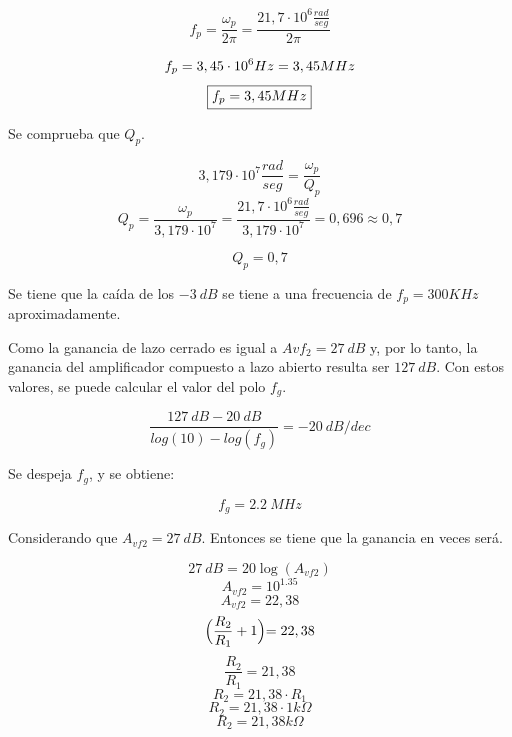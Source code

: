 \begin{equation}
    f_p = \frac{\omega_p}{2\pi}=\frac{21,7 \cdot 10^6 \frac{rad}{seg}}{2\pi}
\end{equation}

\begin{equation}
    f_p = 3,45\cdot 10^6 \space Hz= 3,45\space MHz
\end{equation}
\begin{equation}
    \boxed{
    f_p = 3,45\space MHz
    }
\end{equation}

\bigskip
\hspace{1mm} Se comprueba que \( Q_p \).

\begin{equation}
    3,179 \cdot 10^7 \frac{rad}{seg} = \frac{\omega_p}{Q_p} 
\end{equation}
\begin{equation}
    Q_p = \frac{\omega_p}{3,179 \cdot 10^7} = \frac{21,7 \cdot 10^6 \frac{rad}{seg}}{3,179 \cdot 10^7} = 0,696 \approx 0,7
\end{equation}

\begin{equation}
    \boxed{
    Q_p = 0,7
    }
\end{equation}

\hspace{1mm} Se tiene que la caída de los \(-3~dB\) se tiene a una frecuencia de \(f_p=300KHz\) aproximadamente.

\hspace{1mm} Como la ganancia de lazo cerrado es igual a \(Avf_2=27~dB\) y, por lo tanto, la ganancia del amplificador compuesto a lazo abierto resulta ser \(127~dB\). Con estos valores, se puede calcular el valor del polo \(f_g\).

\begin{equation}
    \frac{127~dB-20~dB}{log(10)-log(f_g)}=-20~dB/dec
\end{equation}

\bigskip
\hspace{1mm} Se despeja \(f_g\), y se obtiene:

\begin{equation}
\boxed{
    f_g=2.2~MHz
}
\end{equation}

\hspace{1mm} Considerando que \(A_{vf2}=27~dB\). Entonces se tiene que la ganancia en veces será.

\[27~dB= 20 \log(A_{vf2})\]
\[A_{vf2}=10^{1.35}\]
\[A_{vf2}=22,38\]
\[\Bigl( {\frac{R_2}{R_1}+1} \Bigl)=22,38\]
\[\frac{R_2}{R_1}=21,38\]
\[R_2=21,38 \cdot R_1\]
\[R_2 = 21,38 \cdot 1k\Omega\]
\[R_2 = 21,38k\Omega\]

